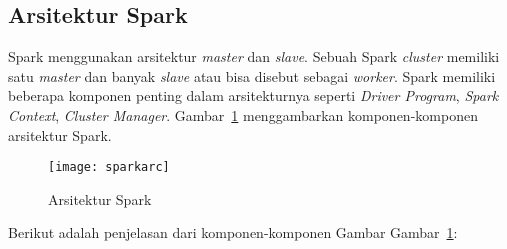 \subsection{Arsitektur Spark}

Spark menggunakan arsitektur \textit{master} dan \textit{slave}. Sebuah Spark \textit{cluster} memiliki satu \textit{master} dan banyak \textit{slave} atau bisa disebut sebagai \textit{worker}. Spark memiliki beberapa komponen penting dalam arsitekturnya seperti \textit{Driver Program}, \textit{Spark Context}, \textit{Cluster Manager}. Gambar~\ref{fig:sparkarc} menggambarkan komponen-komponen arsitektur Spark.


\begin{figure}[H]
    \centering  
    \texttt{[image: sparkarc]}  
    \caption[Arsitektur Spark]{Arsitektur Spark} 
    \label{fig:sparkarc} 
\end{figure}

Berikut adalah penjelasan dari komponen-komponen Gambar Gambar~\ref{fig:sparkarc}:

